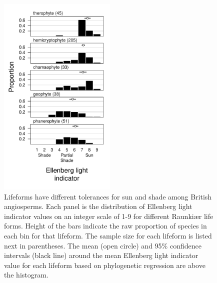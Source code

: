 \documentclass[12pt, oneside]{article}
\begin{document}

\begin{figure}[ht]
\centerline{\includegraphics[width=0.5\textwidth]{figures/figure_lf-light.pdf}}
\caption{Lifeforms have different tolerances for sun and shade among British angiosperms. Each panel is the distribution of Ellenberg light indicator values on an integer scale of 1-9 for different Raunki\ae r life forms. Height of the bars indicate the raw proportion of species in each bin for that lifeform. The sample size for each lifeform is listed next in parentheses. The mean (open circle) and 95\% confidence intervals (black line) around the mean Ellenberg light indicator value for each lifeform based on phylogenetic regression are above the histogram.} 
\label{fig:lf-light}
\end{figure}
\end{document}
